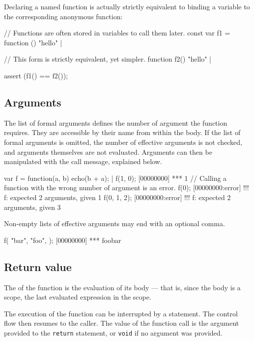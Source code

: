 Declaring a named function is actually strictly equivalent to binding a
variable to the corresponding anonymous function:

\begin{urbiscript}
// Functions are often stored in variables to call them later.
const var f1 = function () { "hello" }|

// This form is strictly equivalent, yet simpler.
function f2() { "hello" }|

assert (f1() == f2());
\end{urbiscript}


\subsection{Arguments}

The list of formal arguments defines the number of argument the function
requires. They are accessible by their name from within the body. If the
list of formal arguments is omitted, the number of effective arguments is
not checked, and arguments themselves are not evaluated. Arguments can then
be manipulated with the call message, explained below.

\begin{urbiscript}
var f = function(a, b) {
  echo(b + a);
}|
f(1, 0);
[00000000] *** 1
// Calling a function with the wrong number of argument is an error.
f(0);
[00000000:error] !!! f: expected 2 arguments, given 1
f(0, 1, 2);
[00000000:error] !!! f: expected 2 arguments, given 3
\end{urbiscript}

Non-empty lists of effective arguments may end with an optional comma.
\begin{urbiscript}
f(
  "bar",
  "foo",
 );
[00000000] *** foobar
\end{urbiscript}


\subsection{Return value}
\label{sec:lang:rv}
The  of the function is the
evaluation of its body --- that is, since the body is a scope, the last
evaluated expression in the scope.

The execution of the function can be interrupted by a 
statement.  The control flow then resumes to the caller.  The value of the
function call is the argument provided to the \lstinline{return} statement,
or \lstinline{void} if no argument was provided.


